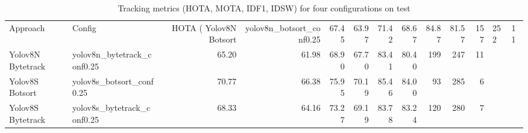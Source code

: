 \begin{table}
\caption{Tracking metrics (HOTA, MOTA, IDF1, IDSW) for four configurations on test}
\label{tab:tracking_metrics_test}
\begin{tabular}{llrrrrrrrrr}
\toprule
Approach & Config & HOTA (%
\midrule
Yolov8N Botsort & yolov8n_botsort_conf0.25 & 67.45 & 63.97 & 71.42 & 68.67 & 84.87 & 81.57 & 157 & 252 & 11 \\
Yolov8N Bytetrack & yolov8n_bytetrack_conf0.25 & 65.20 & 61.98 & 68.90 & 67.70 & 83.41 & 80.40 & 199 & 247 & 11 \\
Yolov8S Botsort & yolov8s_botsort_conf0.25 & 70.77 & 66.38 & 75.95 & 70.19 & 85.46 & 84.00 & 93 & 285 & 6 \\
Yolov8S Bytetrack & yolov8s_bytetrack_conf0.25 & 68.33 & 64.16 & 73.27 & 69.19 & 83.78 & 83.24 & 120 & 280 & 7 \\
\bottomrule
\end{tabular}
\end{table}

